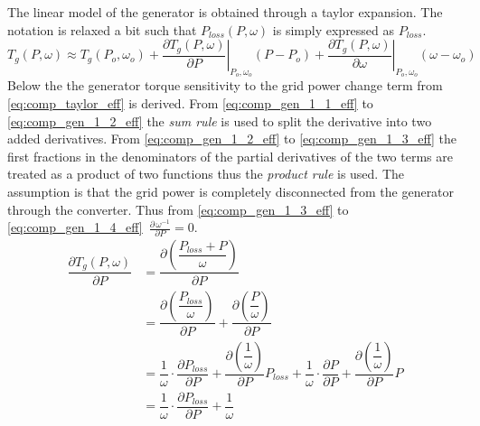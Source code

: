 The linear model of the generator is obtained through a taylor expansion. The notation is relaxed a bit such that $ P_{loss}( P, \omega) $ is simply expressed as $ P_{loss} $.
\begin{equation}\label{eq:comp_taylor_eff}
	T_g( P, \omega) \approx T_g(P_o, \omega_o) + 
	\left. \dfrac{\partial T_g( P, \omega)}{\partial P} \right |_{P_o,\omega_o} ( P-P_o) + 
	\left. \dfrac{\partial T_g( P, \omega)}{\partial \omega} \right |_{P_o,\omega_o} (\omega - \omega_o)
\end{equation}
Below the the generator torque sensitivity to the grid power change term from \cref{eq:comp_taylor_eff} is derived. From \cref{eq:comp_gen_1_1_eff} to \cref{eq:comp_gen_1_2_eff} the \textit{sum rule} is used to split the derivative into two added derivatives. From \cref{eq:comp_gen_1_2_eff} to \cref{eq:comp_gen_1_3_eff} the first fractions in the denominators of the partial derivatives of the two terms are treated as a product of two functions thus the \textit{product rule} is used. The assumption is that the grid power is completely disconnected from the generator through the converter. Thus from \cref{eq:comp_gen_1_3_eff} to \cref{eq:comp_gen_1_4_eff} $ \, \frac{\partial \, \omega^{-1}}{\partial P} = 0 $.
\begin{align} 
	\dfrac{\partial T_g( P, \omega)}{\partial P} &= \dfrac{\partial \left (\dfrac{P_{loss} +  P}{\omega}\right )}{\partial P} \label{eq:comp_gen_1_1_eff} \\
	& = \dfrac{\partial \left (\dfrac{P_{loss}}{\omega} \right )}{\partial P} + \dfrac{\partial \left ( \dfrac{ P}{\omega} \right )}{\partial P} \label{eq:comp_gen_1_2_eff} \\
	& = \dfrac{1}{\omega} \cdot \dfrac{\partial P_{loss}}{\partial P} + \dfrac{\partial \left ( \dfrac{1}{\omega} \right )}{\partial P} P_{loss} + \dfrac{1}{\omega} \cdot \dfrac{\partial P}{\partial P} + \dfrac{\partial \left (\dfrac{1}{\omega} \right )}{\partial P}  P \label{eq:comp_gen_1_3_eff} \\
	& = \dfrac{1}{\omega} \cdot \dfrac{\partial P_{loss}}{\partial P} + \dfrac{1}{\omega} \label{eq:comp_gen_1_4_eff}
\end{align}



